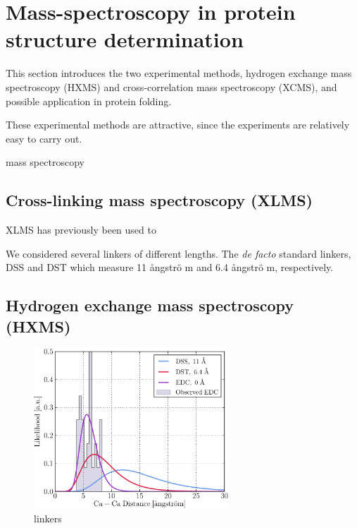 \chapter{Mass-spectroscopy in protein structure determination}

This section introduces the two experimental methods, hydrogen exchange mass spectroscopy (HXMS) and cross-correlation mass spectroscopy (XCMS), and possible application in protein folding.

These experimental methods are attractive, since the experiments are relatively easy to carry out.

mass spectroscopy 

\section{Cross-linking mass spectroscopy (XLMS)}


XLMS has previously been used to 

We considered several linkers of different lengths. The \textit{de facto} standard linkers, DSS and DST which measure 11 \aa ngstr\"o m and 6.4 \aa ngstr\"o m, respectively.

\section{Hydrogen exchange mass spectroscopy (HXMS)}

\begin{figure}
    \centering
    \includegraphics[width=0.65\textwidth]{figures/xcms/lognormal.pdf}
    \caption{linkers}
    \label{fig:linkers}
\end{figure}






